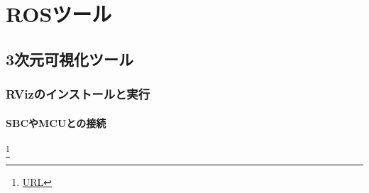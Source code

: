 \vspace{\baselineskip}
\noindent
\begin{description}
\item[]
\end{description}

\chapter{ROSツール}

\section{3次元可視化ツール}

\subsection{RVizのインストールと実行}

\subsubsection{SBCやMCUとの接続}


\footnote{\url{URL}}

\tiny
\scriptsize
\footnotesize
\small
\normalsize
\large
\Large
\LARGE
\huge
\Huge

\textbf{}
